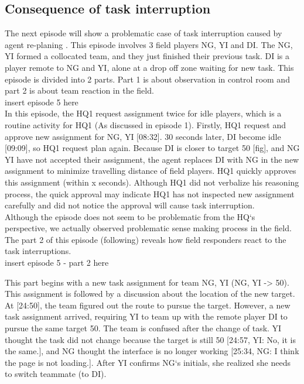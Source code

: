 \subsection{Consequence of task interruption}
The next episode will show a problematic case of task interruption caused by agent re-planing . This episode involves 3 field players NG, YI and DI. The NG, YI formed a collocated team, and they just finished their previous task. DI is a player remote to NG and YI, alone at a drop off zone waiting for new task. This episode is divided into 2 parts. Part 1 is about observation in control room and part 2 is about team reaction in the field.\\

insert episode 5 here\\

In this episode, the HQ1 request assignment twice for idle players, which is a routine activity for HQ1 (As discussed in episode 1). Firstly, HQ1 request and approve new assignment for NG, YI [08:32]. 30 seconds later, DI become idle [09:09], so HQ1 request plan again. Because DI is closer to target 50 [fig], and NG YI have not accepted their assignment, the agent replaces DI with NG in the new assignment to minimize travelling distance of field players.  HQ1 quickly approves this assignment (within x seconds). Although HQ1 did not verbalize his reasoning process, the quick approval may indicate HQ1 has not inspected new assignment carefully and did not notice the approval will cause task interruption.\\

Although the episode does not seem to be problematic from the HQ`s perspective, we actually observed problematic sense making process in the field. The part 2 of this episode (following) reveals how field responders react to the task interruptions.\\

insert episode 5 - part 2 here

This part begins with a new task assignment for team NG, YI (NG, YI -> 50). This assignment is followed by a discussion about the location of the new target. At [24:50], the team figured out the route to pursue the target. However, a new task assignment arrived, requiring YI to team up with the remote player DI to pursue the same target 50. The team is confused after the change of task. YI thought the task did not change because the target is still 50 [24:57, YI: No, it is the same.], and NG thought the interface is no longer working [25:34, NG: I think the page is not loading.]. After YI confirms NG`s initials, she realized she needs to switch teammate (to DI). \\

